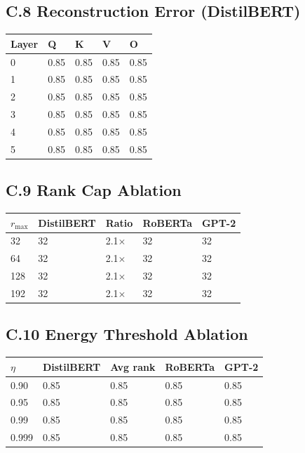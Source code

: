 \subsection{C.8 Reconstruction Error (DistilBERT)}

\begin{table}[H]
\centering
\small
\begin{tabular}{lllll}
\toprule
\textbf{Layer} & \textbf{Q} & \textbf{K} & \textbf{V} & \textbf{O} \\
\midrule
0 & 0.85 & 0.85 & 0.85 & 0.85 \\
1 & 0.85 & 0.85 & 0.85 & 0.85 \\
2 & 0.85 & 0.85 & 0.85 & 0.85 \\
3 & 0.85 & 0.85 & 0.85 & 0.85 \\
4 & 0.85 & 0.85 & 0.85 & 0.85 \\
5 & 0.85 & 0.85 & 0.85 & 0.85 \\
\bottomrule
\end{tabular}
\end{table}

\subsection{C.9 Rank Cap Ablation}

\begin{table}[H]
\centering
\small
\begin{tabular}{lllll}
\toprule
\textbf{$r_\text{max}$} & \textbf{DistilBERT} & \textbf{Ratio} & \textbf{RoBERTa} & \textbf{GPT-2} \\
\midrule
32 & 32 & 2.1$\times$ & 32 & 32 \\
64 & 32 & 2.1$\times$ & 32 & 32 \\
128 & 32 & 2.1$\times$ & 32 & 32 \\
192 & 32 & 2.1$\times$ & 32 & 32 \\
\bottomrule
\end{tabular}
\end{table}

\subsection{C.10 Energy Threshold Ablation}

\begin{table}[H]
\centering
\small
\begin{tabular}{lllll}
\toprule
\textbf{$\eta$} & \textbf{DistilBERT} & \textbf{Avg rank} & \textbf{RoBERTa} & \textbf{GPT-2} \\
\midrule
0.90 & 0.85 & 0.85 & 0.85 & 0.85 \\
0.95 & 0.85 & 0.85 & 0.85 & 0.85 \\
0.99 & 0.85 & 0.85 & 0.85 & 0.85 \\
0.999 & 0.85 & 0.85 & 0.85 & 0.85 \\
\bottomrule
\end{tabular}
\end{table}

